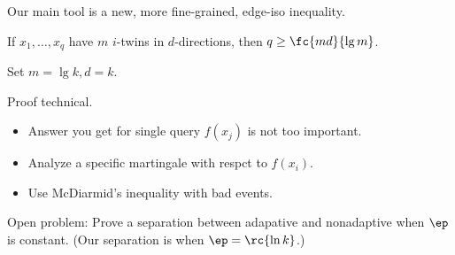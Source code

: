 Our main tool is a new, more fine-grained, edge-iso inequality.
\begin{thm}
If $x_1,\ldots, x_q$ have $m$ $i$-twins in $d$-directions, then $q\ge \fc{md}{\lg m}$.
\end{thm}
Set $m=\lg k, d=k$.

Proof technical. 
\begin{itemize}
\item
Answer you get for single query $f(x_j)$ is not too important.
\item 
Analyze a specific martingale with respct to $f(x_i)$.
\item Use McDiarmid's inequality with bad events.
\end{itemize}
Open problem: Prove a separation between adapative and nonadaptive when $\ep$ is constant. (Our separation is when $\ep=\rc{\ln k}$.)

